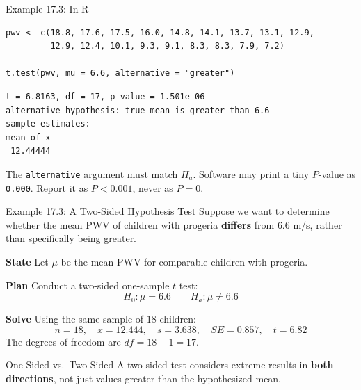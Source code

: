 \documentclass[aspectratio=169,10pt]{beamer}
\newcommand{\step}[1]{\textcolor{CourseBlue}{\textbf{#1}}\quad}
\begin{document}
\begin{frame}[fragile]{Example 17.3: In R}
\begin{lstlisting}[style=Rstyle]
pwv <- c(18.8, 17.6, 17.5, 16.0, 14.8, 14.1, 13.7, 13.1, 12.9,
         12.9, 12.4, 10.1, 9.3, 9.1, 8.3, 8.3, 7.9, 7.2)

t.test(pwv, mu = 6.6, alternative = "greater")
\end{lstlisting}

\begin{verbatim}
t = 6.8163, df = 17, p-value = 1.501e-06
alternative hypothesis: true mean is greater than 6.6
sample estimates:
mean of x
 12.44444
\end{verbatim}

The \texttt{alternative} argument must match $H_a$. Software may print a tiny $P$-value as \texttt{0.000}. Report it as $P<0.001$, never as $P=0$.
\end{frame}

\begin{frame}{Example 17.3: A Two-Sided Hypothesis Test}
\small
Suppose we want to determine whether the mean PWV of children with progeria \textbf{differs} from $6.6$ m/s, rather than specifically being greater.

\vspace{0.2cm}
\step{State} Let $\mu$ be the mean PWV for comparable children with progeria.

\vspace{0.1cm}
\step{Plan} Conduct a two-sided one-sample $t$ test:
$$H_0:\mu=6.6 \qquad H_a:\mu\neq6.6$$

\vspace{0.1cm}
\step{Solve} Using the same sample of $18$ children:
$$n=18,\quad \bar{x}=12.444,\quad s=3.638, \quad SE=0.857, \quad t=6.82$$
The degrees of freedom are $df=18-1=17$.

\vspace{0.1cm}
\begin{block}{One-Sided vs.\ Two-Sided}
A two-sided test considers extreme results in \textbf{both directions}, not just values greater than the hypothesized mean.
\end{block}
\end{frame}
\end{document}

